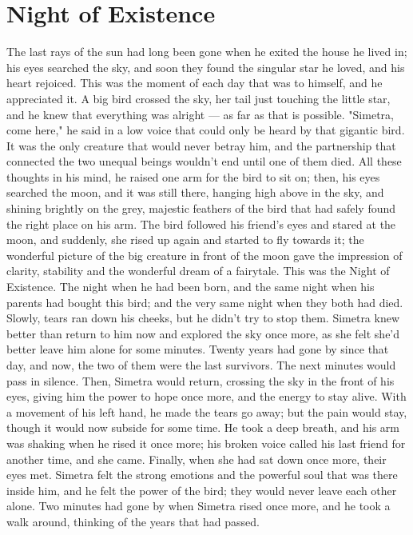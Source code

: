 \chapter{Night of Existence}
\label{cha:night-existence}
The last rays of the sun had long been gone when he exited the house he lived in; his eyes searched the sky, and soon they found the singular star he loved, and his heart rejoiced. This was the moment of each day that was to himself, and he appreciated it. 
A big bird crossed the sky, her tail just touching the little star, and he knew that everything was alright --- as far as that is possible. 
"Simetra, come here," he said in a low voice that could only be heard by that gigantic bird. It was the only creature that would never betray him, and the partnership that connected the two unequal beings wouldn't end until one of them died. All these thoughts in his mind, he raised one arm for the bird to sit on; then, his eyes searched the moon, and it was still there, hanging high above in the sky, and shining brightly on the grey, majestic feathers of the bird that had safely found the right place on his arm. 
The bird followed his friend's eyes and stared at the moon, and suddenly, she rised up again and started to fly towards it; the wonderful picture of the big creature in front of the moon gave the impression of clarity, stability and the wonderful dream of a fairytale. 
This was the Night of Existence. 
The night when he had been born, and the same night when his parents had bought this bird; and the very same night when they both had died. 
Slowly, tears ran down his cheeks, but he didn't try to stop them. Simetra knew better than return to him now and explored the sky once more, as she felt she'd better leave him alone for some minutes. Twenty years had gone by since that day, and now, the two of them were the last survivors. 
The next minutes would pass in silence. Then, Simetra would return, crossing the sky in the front of his eyes, giving him the power to hope once more, and the energy to stay alive. 
With a movement of his left hand, he made the tears go away; but the pain would stay, though it would now subside for some time. 
He took a deep breath, and his arm was shaking when he rised it once more; his broken voice called his last friend for another time, and she came. Finally, when she had sat down once more, their eyes met. Simetra felt the strong emotions and the powerful soul that was there inside him, and he felt the power of the bird; they would never leave each other alone. 
Two minutes had gone by when Simetra rised once more, and he took a walk around, thinking of the years that had passed. 
